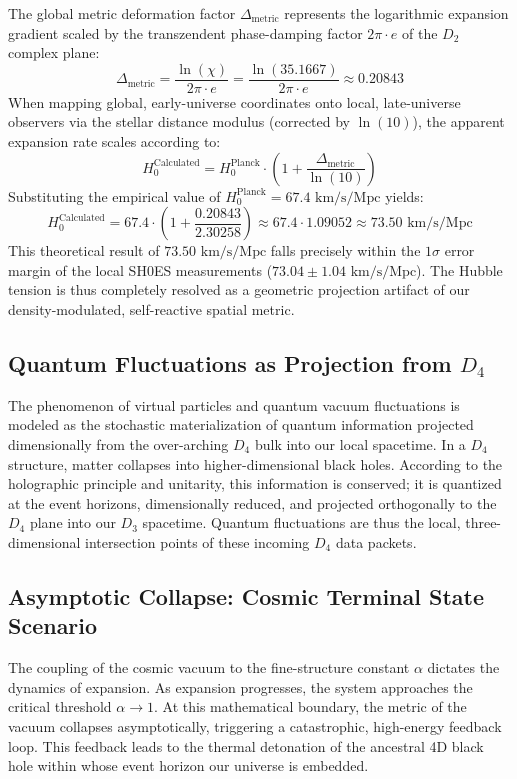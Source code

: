 \documentclass[11pt,a4paper]{article}
\theoremstyle{plain}
\theoremstyle{definition}
\theoremstyle{remark}
\begin{document}
The global metric deformation factor $\Delta_{\text{metric}}$ represents the logarithmic expansion gradient scaled by the transzendent phase-damping factor $2\pi \cdot e$ of the $D_2$ complex plane:
\begin{equation}
\Delta_{\text{metric}} = \frac{\ln(\chi)}{2\pi \cdot e} = \frac{\ln(35.1667)}{2\pi \cdot e} \approx 0.20843
\end{equation}
When mapping global, early-universe coordinates onto local, late-universe observers via the stellar distance modulus (corrected by $\ln(10)$), the apparent expansion rate scales according to:
\begin{equation}
H_0^{\text{Calculated}} = H_0^{\text{Planck}} \cdot \left(1 + \frac{\Delta_{\text{metric}}}{\ln(10)}\right)
\end{equation}
Substituting the empirical value of $H_0^{\text{Planck}} = 67.4\text{ km/s/Mpc}$ yields:
\begin{equation}
H_0^{\text{Calculated}} = 67.4 \cdot \left(1 + \frac{0.20843}{2.30258}\right) \approx 67.4 \cdot 1.09052 \approx 73.50\text{ km/s/Mpc}
\end{equation}
This theoretical result of $73.50\text{ km/s/Mpc}$ falls precisely within the $1\sigma$ error margin of the local SH0ES measurements ($73.04 \pm 1.04\text{ km/s/Mpc}$). The Hubble tension is thus completely resolved as a geometric projection artifact of our density-modulated, self-reactive spatial metric.
\subsection{Quantum Fluctuations as Projection from $D_4$} 
The phenomenon of virtual particles and quantum vacuum fluctuations is modeled as the stochastic materialization of quantum information projected dimensionally from the over-arching $D_4$ bulk into our local spacetime. In a $D_4$ structure, matter collapses into higher-dimensional black holes. According to the holographic principle and unitarity, this information is conserved; it is quantized at the event horizons, dimensionally reduced, and projected orthogonally to the $D_4$ plane into our $D_3$ spacetime. Quantum fluctuations are thus the local, three-dimensional intersection points of these incoming $D_4$ data packets.

\subsection{Asymptotic Collapse: Cosmic Terminal State Scenario} 
The coupling of the cosmic vacuum to the fine-structure constant $\alpha$ dictates the dynamics of expansion. As expansion progresses, the system approaches the critical threshold $\alpha \to 1$. At this mathematical boundary, the metric of the vacuum collapses asymptotically, triggering a catastrophic, high-energy feedback loop. This feedback leads to the thermal detonation of the ancestral 4D black hole within whose event horizon our universe is embedded.
\end{document}
